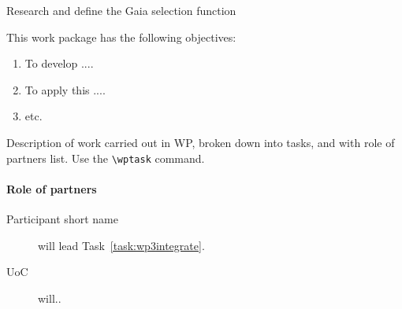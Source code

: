\begin{workpackage}{Research and define the Gaia selection function}
  \label{wp:selfungaia}
  \wpend{\duration} %

  \makewptable %

  \begin{wpobjectives}
    This work package has the following objectives:
    \begin{enumerate}
      \item To develop ....
      \item To apply this ....
      \item etc.
    \end{enumerate}
  \end{wpobjectives}

  \begin{wpdescription}

    Description of work carried out in WP, broken down into tasks, and
    with role of partners list. Use the \texttt{\textbackslash wptask} command.


    \paragraph{Role of partners}
    \begin{description}
      \item[Participant short name] will lead Task~\ref{task:wp3integrate}.
      \item[UoC] will..
    \end{description}
  \end{wpdescription}

  \begin{wpdeliverables}

    \label{dev:wp2specs}

    \label{dev:wp2implementation}

    \label{dev:wp2prototype}

  \end{wpdeliverables}

\end{workpackage}


